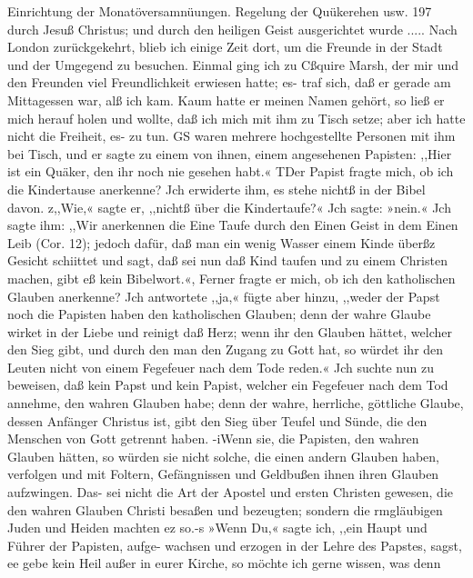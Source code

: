 Einrichtung der Monatöversamnüungen. Regelung der Quükerehen usw. 197
durch Jesuß Christus; und durch den heiligen Geist ausgerichtet
wurde .....
Nach London zurückgekehrt, blieb ich einige Zeit dort, um die
Freunde in der Stadt und der Umgegend zu besuchen. Einmal
ging ich zu Cßquire Marsh, der mir und den Freunden viel
Freundlichkeit erwiesen hatte; es- traf sich, daß er gerade am
Mittagessen war, alß ich kam. Kaum hatte er meinen Namen
gehört, so ließ er mich herauf holen und wollte, daß ich mich mit
ihm zu Tisch setze; aber ich hatte nicht die Freiheit, es- zu tun.
GS waren mehrere hochgestellte Personen mit ihm bei Tisch, und
er sagte zu einem von ihnen, einem angesehenen Papisten: ,,Hier
ist ein Quäker, den ihr noch nie gesehen habt.« TDer Papist fragte
mich, ob ich die Kindertause anerkenne? Jch erwiderte ihm, es
stehe nichtß in der Bibel davon. z,,Wie,« sagte er, ,,nichtß über
die Kindertaufe?« Jch sagte: »nein.« Jch sagte ihm: ,,Wir
anerkennen die Eine Taufe durch den Einen Geist in dem Einen
Leib (Cor. 12); jedoch dafür, daß man ein wenig Wasser einem
Kinde überßz Gesicht schiittet und sagt, daß sei nun daß Kind taufen
und zu einem Christen machen, gibt eß kein Bibelwort.«, Ferner
fragte er mich, ob ich den katholischen Glauben anerkenne? Jch
antwortete ,,ja,« fügte aber hinzu, ,,weder der Papst noch die
Papisten haben den katholischen Glauben; denn der wahre Glaube
wirket in der Liebe und reinigt daß Herz; wenn ihr den Glauben
hättet, welcher den Sieg gibt, und durch den man den Zugang
zu Gott hat, so würdet ihr den Leuten nicht von einem Fegefeuer
nach dem Tode reden.« Jch suchte nun zu beweisen, daß kein
Papst und kein Papist, welcher ein Fegefeuer nach dem Tod
annehme, den wahren Glauben habe; denn der wahre, herrliche,
göttliche Glaube, dessen Anfänger Christus ist, gibt den Sieg über
Teufel und Sünde, die den Menschen von Gott getrennt haben.
-iWenn sie, die Papisten, den wahren Glauben hätten, so würden
sie nicht solche, die einen andern Glauben haben, verfolgen und
mit Foltern, Gefängnissen und Geldbußen ihnen ihren Glauben
aufzwingen. Das- sei nicht die Art der Apostel und ersten Christen
gewesen, die den wahren Glauben Christi besaßen und bezeugten;
sondern die rmgläubigen Juden und Heiden machten ez so.-s »Wenn
Du,« sagte ich, ,,ein Haupt und Führer der Papisten, aufge-
wachsen und erzogen in der Lehre des Papstes, sagst, ee gebe kein
Heil außer in eurer Kirche, so möchte ich gerne wissen, was denn


